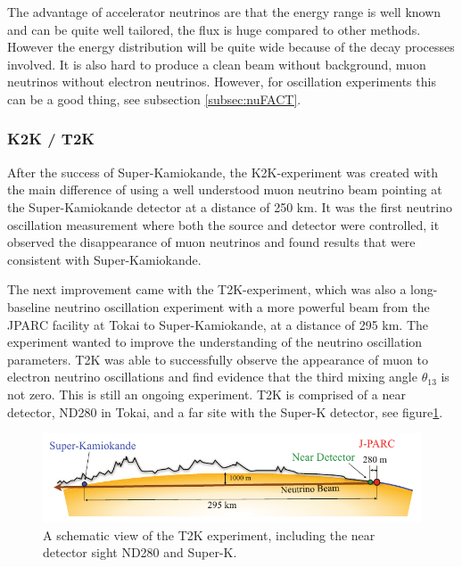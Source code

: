 The advantage of accelerator neutrinos are that the energy range is well known and can be quite well tailored, the flux is huge compared to other methods. However the energy distribution will be quite wide because of the decay processes involved. It is also hard to produce a clean beam without background, muon neutrinos without electron neutrinos. However, for oscillation experiments this can be a good thing, see subsection \ref{subsec:nuFACT}.

\subsubsection{K2K / T2K}
After the success of Super-Kamiokande, the K2K-experiment\cite{22K2K} was created with the main difference of using a well understood muon neutrino beam pointing at the Super-Kamiokande detector at a distance of 250 km. It was the first neutrino oscillation measurement where both the source and detector were controlled, it observed the disappearance of muon neutrinos and found results that were consistent with Super-Kamiokande.

The next improvement came with the T2K-experiment\cite{21T2K}, which was also a long-baseline neutrino oscillation experiment with a more powerful beam from the JPARC facility at Tokai to Super-Kamiokande, at a distance of 295 km. The experiment wanted to improve the understanding of the neutrino oscillation parameters. T2K was able to successfully observe the appearance of muon to electron neutrino oscillations and find evidence that the third mixing angle $\theta_{13}$ is not zero. This is still an ongoing experiment. T2K  is comprised of a near detector, ND280 in Tokai, and a far site with the Super-K detector, see figure\ref{fig:T2K}.

\begin{figure}[h!]
\centering
  \centering
\includegraphics[width=\textwidth]{figures/T2KBeam.png}
\vspace{2mm}
\caption{A schematic view of the T2K experiment, including the near detector sight ND280 and Super-K.}
\label{fig:T2K}
\end{figure}

